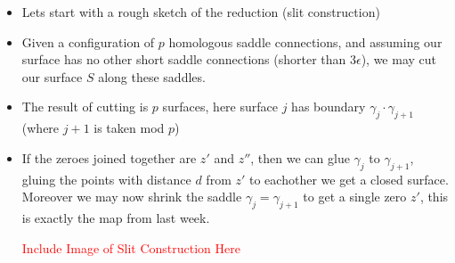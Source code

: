 \documentclass[20pt]{article}
\theoremstyle{definition}
\begin{document}
    \begin{itemize}
        \item Lets start with a rough sketch of the reduction (slit construction)
        \item Given a configuration of \(p\) homologous saddle connections, and assuming our surface has no other short saddle connections (shorter than \(3 \epsilon\)), we may cut our surface \(S\) along these saddles.
        \item The result of cutting is \(p\) surfaces, here surface \(j\) has boundary \(\gamma_j \cdot \gamma_{j+1}\) (where \(j+1\) is taken mod \(p\))
        \item If the zeroes joined together are \(z'\) and \(z''\), then we can glue \(\gamma_j\) to \(\gamma_{j+1}\), gluing the points with distance \(d\) from \(z'\) to eachother we get a closed surface. Moreover we may now shrink the saddle \(\gamma_j = \gamma_{j+1}\) to get a single zero \(z'\), this is exactly the map from last week.
        
        \textcolor{red}{Include Image of Slit Construction Here}
    \end{itemize}
\end{document}
